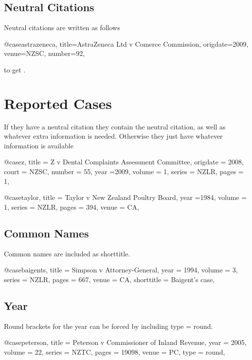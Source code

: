 \documentclass{book}
\begin{document}
\subsection{Neutral Citations}
Neutral citations are written as follows
\begin{bib}
@case{astrazeneca,
title={AstraZeneca Ltd v Comerce Commission},
origdate={2009},
venue={NZSC},
number={92},
}
\end{bib}

to get \cite{astrazeneca}.

\section{Reported Cases}
If they have a neutral citation they contain the neutral citation, as well as whatever extra information is needed. Otherwise they just have whatever information is available

\begin{bib}
@case{z,
title = {Z v Dental Complaints Assessment Committee},
origdate = {2008},
court = {NZSC},
number = {55},
year ={2009},
volume = {1},
series = {NZLR},
pages = {1},
}
\end{bib}

\begin{bib}
@case{taylor,
title = {Taylor v New Zealand Poultry Board},
year ={1984},
volume = {1},
series = {NZLR},
pages = {394},
venue = {CA},
}
\end{bib}
\subsection{Common Names}

Common names are included as shorttitle.
\begin{bib}
@case{baigents,
title = {Simpson v Attorney-General},
year = {1994},
volume = {3},
series = {NZLR},
pages = {667},
venue = {CA},
shorttitle = {Baigent's case},
}
\end{bib}

\subsection{Year}

Round brackets for the year can be forced by including type = {round}.
\begin{bib}
@case{peterson,
title = {Peterson v Commissioner of Inland Revenue},
year = {2005},
volume = {22},
series = {NZTC},
pages = {\num{19098}},
venue = {PC},
type = {round},
}
\end{bib}
\end{document}
